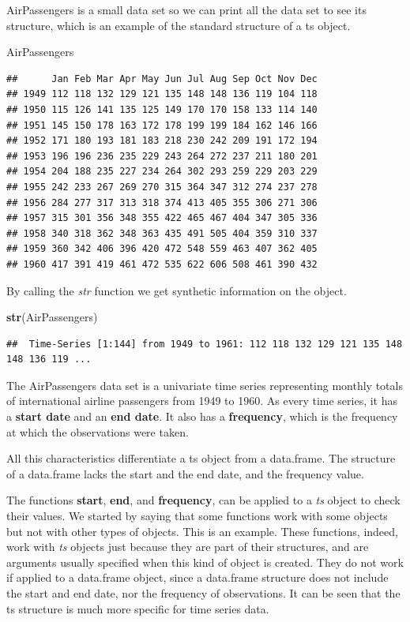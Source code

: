\documentclass[
]{article}
\newenvironment{Shaded}{\begin{snugshade}}{\end{snugshade}}
\newcommand{\KeywordTok}[1]{\textcolor[rgb]{0.13,0.29,0.53}{\textbf{#1}}}
\newcommand{\NormalTok}[1]{#1}
\begin{document}
AirPassengers is a small data set so we can print all the data set to see its structure, which is an example of the standard structure of a ts object.

\begin{Shaded}
\begin{Highlighting}[]
\NormalTok{AirPassengers}
\end{Highlighting}
\end{Shaded}

\begin{verbatim}
##      Jan Feb Mar Apr May Jun Jul Aug Sep Oct Nov Dec
## 1949 112 118 132 129 121 135 148 148 136 119 104 118
## 1950 115 126 141 135 125 149 170 170 158 133 114 140
## 1951 145 150 178 163 172 178 199 199 184 162 146 166
## 1952 171 180 193 181 183 218 230 242 209 191 172 194
## 1953 196 196 236 235 229 243 264 272 237 211 180 201
## 1954 204 188 235 227 234 264 302 293 259 229 203 229
## 1955 242 233 267 269 270 315 364 347 312 274 237 278
## 1956 284 277 317 313 318 374 413 405 355 306 271 306
## 1957 315 301 356 348 355 422 465 467 404 347 305 336
## 1958 340 318 362 348 363 435 491 505 404 359 310 337
## 1959 360 342 406 396 420 472 548 559 463 407 362 405
## 1960 417 391 419 461 472 535 622 606 508 461 390 432
\end{verbatim}

By calling the \emph{str} function we get synthetic information on the object.

\begin{Shaded}
\begin{Highlighting}[]
\KeywordTok{str}\NormalTok{(AirPassengers)}
\end{Highlighting}
\end{Shaded}

\begin{verbatim}
##  Time-Series [1:144] from 1949 to 1961: 112 118 132 129 121 135 148 148 136 119 ...
\end{verbatim}

The AirPassengers data set is a univariate time series representing monthly totals of international airline passengers from 1949 to 1960. As every time series, it has a \textbf{start date} and an \textbf{end date}. It also has a \textbf{frequency}, which is the frequency at which the observations were taken.

All this characteristics differentiate a ts object from a data.frame. The structure of a data.frame lacks the start and the end date, and the frequency value.

The functions \textbf{start}, \textbf{end}, and \textbf{frequency}, can be applied to a \emph{ts} object to check their values. We started by saying that some functions work with some objects but not with other types of objects. This is an example. These functions, indeed, work with \emph{ts} objects just because they are part of their structures, and are arguments usually specified when this kind of object is created. They do not work if applied to a data.frame object, since a data.frame structure does not include the start and end date, nor the frequency of observations. It can be seen that the ts structure is much more specific for time series data.
\end{document}
